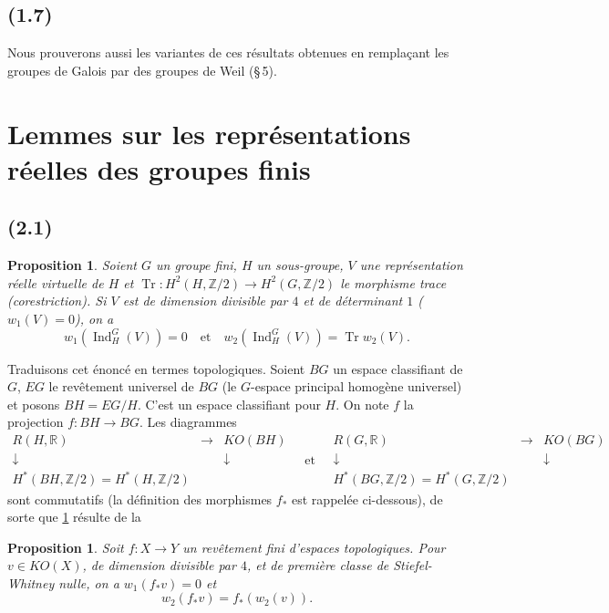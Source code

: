 \documentclass[11pt]{amsart}
\theoremstyle{plain}
\newtheorem{proposition}[theoreme]{Proposition}
\theoremstyle{definition}
\DeclareMathOperator{\Ind}{Ind}
\DeclareMathOperator{\Tr}{Tr}
\newcommand{\R}{\mathbb{R}}
\newcommand{\Z}{\mathbb{Z}}
\begin{document}
\subsection{(1.7)}
Nous prouverons aussi les variantes de ces r\'esultats obtenues en rempla\c{c}ant les groupes de Galois par des groupes de Weil (\S\,5).

\section{Lemmes sur les repr\'esentations r\'eelles des groupes finis}

\subsection{(2.1)}
\begin{proposition}\label{prop:2.1}
Soient $G$ un groupe fini, $H$ un sous-groupe, $V$ une repr\'esentation r\'eelle virtuelle de $H$ et $\Tr\colon H^2(H,\Z/2)\to H^2(G,\Z/2)$ le morphisme trace (corestriction). Si $V$ est de dimension divisible par $4$ et de d\'eterminant $1$ ($w_1(V)=0$), on a
\[
w_1(\Ind_H^G(V))=0\quad\text{et}\quad w_2(\Ind_H^G(V))=\Tr w_2(V).
\]
\end{proposition}

Traduisons cet \'enonc\'e en termes topologiques. Soient $BG$ un espace classifiant de $G$, $EG$ le rev\^etement universel de $BG$ (le $G$-espace principal homog\`ene universel) et posons $BH=EG/H$. C'est un espace classifiant pour $H$. On note $f$ la projection $f\colon BH\to BG$. Les diagrammes
\[
\begin{array}{ccc}
R(H,\R) & \longrightarrow & KO(BH) \\ \downarrow & & \downarrow \\ H^*(BH,\Z/2)=H^*(H,\Z/2) & & \end{array}
\quad\text{et}\quad
\begin{array}{ccc}
R(G,\R) & \longrightarrow & KO(BG) \\ \downarrow & & \downarrow \\ H^*(BG,\Z/2)=H^*(G,\Z/2) & & \end{array}
\]
sont commutatifs (la d\'efinition des morphismes $f_*$ est rappel\'ee ci-dessous), de sorte que \ref{prop:2.1} r\'esulte de la

\begin{proposition}\label{prop:2.2}
Soit $f\colon X\to Y$ un rev\^etement fini d'espaces topologiques. Pour $v\in KO(X)$, de dimension divisible par $4$, et de premi\`ere classe de Stiefel-Whitney nulle, on a $w_1(f_*v)=0$ et
\[
w_2(f_*v)=f_*(w_2(v)).
\]
\end{proposition}
\end{document}
